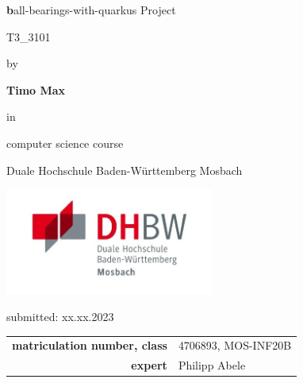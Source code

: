 \def\title{ball-bearings-with-quarkus Project}
\def\abgabe{xx.xx.2023}

\begin{titlepage}
	
	
	
	\vspace{5pt}
	
	\begin{center}
		
		\Large \textbf\title
		
		\vspace{50pt}
		
		\large T3\_3101
		
		by 
		
		\large \textbf{Timo Max} 
		
		\vspace{15pt}
		
		in 
		
		\large computer science course
		
		Duale Hochschule Baden-Württemberg Mosbach

        \vspace{10pt}

        \includegraphics[height=3.5cm]{images/dhbw-logo.jpg}
		
		\vspace{20pt}
		
		\large submitted: \abgabe
		
		\vspace{30pt}

		
		\begin{table}[h]
			\centering
			\begin{tabular}{r l}
				\large\textbf{matriculation number, class} & \large 4706893, MOS-INF20B \\
                \large\textbf{expert} & \large Philipp Abele \\
			\end{tabular}
			
		\end{table}
		
	\end{center}
	
	
\end{titlepage}